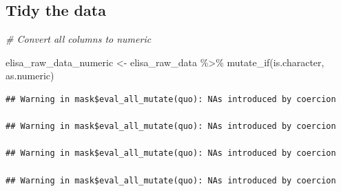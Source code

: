 \documentclass[
]{book}
\newenvironment{Shaded}{\begin{snugshade}}{\end{snugshade}}
\newcommand{\CommentTok}[1]{\textcolor[rgb]{0.56,0.35,0.01}{\textit{#1}}}
\newcommand{\FunctionTok}[1]{\textcolor[rgb]{0.00,0.00,0.00}{#1}}
\newcommand{\NormalTok}[1]{#1}
\newcommand{\OtherTok}[1]{\textcolor[rgb]{0.56,0.35,0.01}{#1}}
\newcommand{\SpecialCharTok}[1]{\textcolor[rgb]{0.00,0.00,0.00}{#1}}
\begin{document}
\hypertarget{tidy-the-data}{%
\subsection{Tidy the data}\label{tidy-the-data}}

\begin{Shaded}
\begin{Highlighting}[]
\CommentTok{\# Convert all columns to numeric}

\NormalTok{elisa\_raw\_data\_numeric }\OtherTok{\textless{}{-}}\NormalTok{ elisa\_raw\_data }\SpecialCharTok{\%\textgreater{}\%} 
  \FunctionTok{mutate\_if}\NormalTok{(is.character, as.numeric)}
\end{Highlighting}
\end{Shaded}

\begin{verbatim}
## Warning in mask$eval_all_mutate(quo): NAs introduced by coercion

## Warning in mask$eval_all_mutate(quo): NAs introduced by coercion

## Warning in mask$eval_all_mutate(quo): NAs introduced by coercion

## Warning in mask$eval_all_mutate(quo): NAs introduced by coercion
\end{verbatim}
\end{document}
